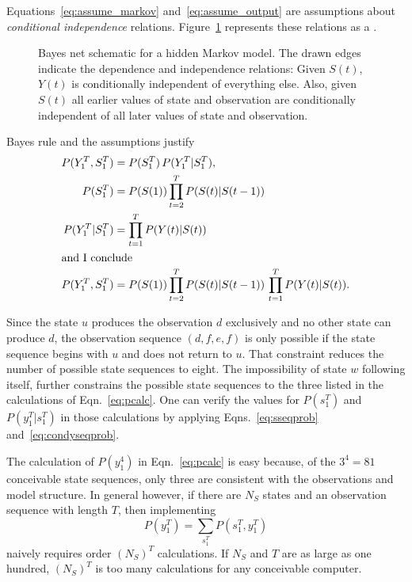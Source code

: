 \documentclass[]{article}
\newcommand{\ts}[3]{#1_{#2}^{#3}}                    %
\newcommand{\ti}[2]{{#1}{(#2)}}                  %
\newcommand{\plotsize}{%
  \fontsize{9}{9}%
  \selectfont}
\renewcommand{\comment}[1]{}
\newcommand*{\inputfig}[2]{}
\newcommand*{\InputIntroductionFig}[1]{\inputfig{../../figs/introduction}{#1}}
\begin{document}
Equations~\eqref{eq:assume_markov} and~\eqref{eq:assume_output} are
assumptions about \emph{conditional independence} relations.
Figure~\ref{fig:dhmm_net} represents these relations as a %
\emph{}.

\begin{figure}[htbp]
  \centering{\plotsize%
    \InputIntroductionFig{Markov_dhmm_net}
  }
  \caption[\comment{fig:dhmm-net }Bayes net schematic for a hidden Markov model.]%
  {Bayes net schematic for a hidden Markov model.  The drawn edges
    indicate the dependence and independence relations: Given
    $\ti{S}{t}$, $\ti{Y}{t}$ is conditionally independent of
    everything else.  Also, given $\ti{S}{t}$ all earlier values of
    state and observation are conditionally independent of all later
    values of state and observation.}\label{fig:dhmm_net}
\end{figure}

Bayes rule and the assumptions justify
\begin{align}
  P(\ts{Y}{1}{T},\ts{S}{1}{T}) &= P(\ts{S}{1}{T}) \, %
                                   P(\ts{Y}{1}{T}|\ts{S}{1}{T}),\notag\\
  \label{eq:sseqprob}%
  P(\ts{S}{1}{T})              &= P(\ti{S}{1}) %
                                   \prod_{t=2}^T P(\ti{S}{t}|\ti{S}{t-1})\\
  \label{eq:condyseqprob}%
  P(\ts{Y}{1}{T}|\ts{S}{1}{T}) &= \prod_{t=1}^T P(\ti{Y}{t}|\ti{S}{t})\\
  \intertext{and I conclude}
  P(\ts{Y}{1}{T},\ts{S}{1}{T}) &= P(\ti{S}{1}) %
                                   \prod_{t=2}^T P(\ti{S}{t}|\ti{S}{t-1})\, %
                                   \prod_{t=1}^T P(\ti{Y}{t}|\ti{S}{t}).\notag
\end{align}

Since the state $u$ produces the observation $d$ exclusively and no
other state can produce $d$, the observation sequence $(d,f,e,f)$ is
only possible if the state sequence begins with $u$ and does not
return to $u$.  That constraint reduces the number of possible state
sequences to eight.  The impossibility of state $w$ following itself,
further constrains the possible state sequences to the three listed in
the calculations of Eqn.~\eqref{eq:pcalc}.  One can verify the values
for $P(\ts{s}{1}{T})$ and $P(\ts{y}{1}{T}|\ts{s}{1}{T})$ in those
calculations by applying Eqns.~\eqref{eq:sseqprob}
and~\eqref{eq:condyseqprob}.

The calculation of $P(\ts{y}{1}{4})$ in Eqn.~\eqref{eq:pcalc} is easy
because, of the $3^4 = 81$ conceivable state sequences, only three are
consistent with the observations and model structure.  In general
however, if there are $N_S$ states and an observation sequence with
length $T$, then implementing
\begin{equation*}
  P(\ts{y}{1}{T}) = \sum_{\ts{s}{1}{T}} P\left(\ts{s}{1}{T}
    ,\ts{y}{1}{T} \right)
\end{equation*}
naively requires order ${\left(N_S\right)}^T$ calculations.  If $N_S$
and $T$ are as large as one hundred, ${\left(N_S\right)}^T$ is too
many calculations for any conceivable computer.
\end{document}
